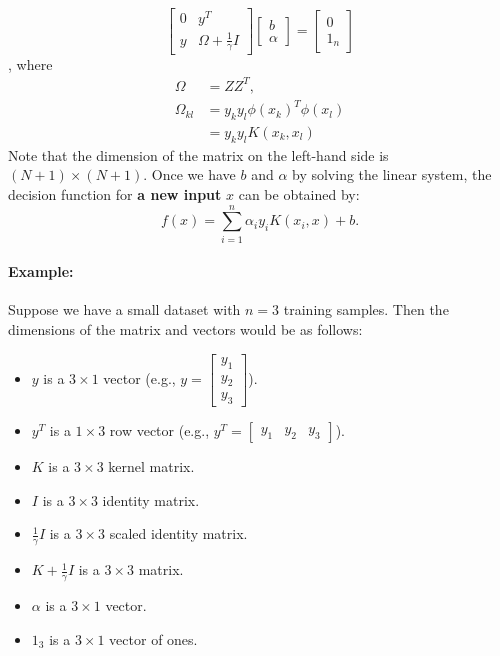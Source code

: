 \[
\begin{bmatrix}
0 & y^T \\
y & \Omega + \frac{1}{\gamma} I
\end{bmatrix}
\begin{bmatrix}
b \\
\alpha
\end{bmatrix}
=
\begin{bmatrix}
0 \\
1_n
\end{bmatrix}
\], 
where 
\begin{align*}
	\Omega &= ZZ^T,\\  
	\Omega_{kl}&= y_ky_l\phi(x_k)^T\phi(x_l)\\ 
			   &= y_ky_lK(x_k, x_l)
\end{align*}
Note that the dimension of the matrix on the left-hand side is $(N+1)\times (N+1)$. Once we have \( b \) and \( \alpha \) by solving the linear system, the decision function for \textbf{a new input} \( x \) can be obtained by:
\[
f(x) = \sum_{i=1}^n \alpha_i y_i K(x_i, x) + b.
\]
\paragraph{Example: }Suppose we have a small dataset with \( n = 3 \) training samples. Then the dimensions of the matrix and vectors would be as follows:
\begin{itemize}
	\item \( y \) is a \( 3 \times 1 \) vector (e.g., \( y = \begin{bmatrix} y_1 \\ y_2 \\ y_3 \end{bmatrix} \)).
	\item \( y^T \) is a \( 1 \times 3 \) row vector (e.g., \( y^T = \begin{bmatrix} y_1 & y_2 & y_3 \end{bmatrix} \)).
	\item \( K \) is a \( 3 \times 3 \) kernel matrix.
	\item \( I \) is a \( 3 \times 3 \) identity matrix.
	\item \( \frac{1}{\gamma} I \) is a \( 3 \times 3 \) scaled identity matrix.
	\item \( K + \frac{1}{\gamma} I \) is a \( 3 \times 3 \) matrix.
	\item \( \alpha \) is a \( 3 \times 1 \) vector.
	\item \( 1_3 \) is a \( 3 \times 1 \) vector of ones.
\end{itemize}


